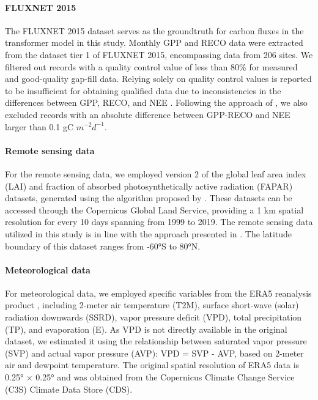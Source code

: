 \paragraph*{FLUXNET 2015}
The FLUXNET 2015 dataset \citep{pastorello2020fluxnet2015} serves as the groundtruth for carbon fluxes in the transformer model in this study. Monthly GPP and RECO data were extracted from the dataset tier 1 of FLUXNET 2015, encompassing data from 206 sites. We filtered out records with a quality control value of less than 80\% for measured and good-quality gap-fill data. Relying solely on quality control values is reported to be insufficient for obtaining qualified data due to inconsistencies in the differences between GPP, RECO, and NEE \citep{zeng2020global, tramontana2016predicting}. Following the approach of \citep{zeng2020global}, we also excluded records with an absolute difference between GPP-RECO and NEE larger than 0.1 gC $m^{-2} d^{-1}$.
\paragraph*{Remote sensing data}
For the remote sensing data, we employed version 2 of the global leaf area index (LAI) and fraction of absorbed photosynthetically active radiation (FAPAR) datasets, generated using the algorithm proposed by \citep{verger2014near}. These datasets can be accessed through the Copernicus Global Land Service, providing a 1 km spatial resolution for every 10 days spanning from 1999 to 2019. The remote sensing data utilized in this study is in line with the approach presented in \citep{zeng2020global}. The latitude boundary of this dataset ranges from -60°S to 80°N. \par
\paragraph*{Meteorological data}
For meteorological data, we employed specific variables from the ERA5 reanalysis product \citep{hersbach2020era5}, including 2-meter air temperature (T2M), surface short-wave (solar) radiation downwards (SSRD), vapor pressure deficit (VPD), total precipitation (TP), and evaporation (E). As VPD is not directly available in the original dataset, we estimated it using the relationship between saturated vapor pressure (SVP) and actual vapor pressure (AVP): VPD = SVP - AVP, based on 2-meter air and dewpoint temperature. The original spatial resolution of ERA5 data is 0.25° × 0.25° and was obtained from the Copernicus Climate Change Service (C3S) Climate Data Store (CDS). \par

